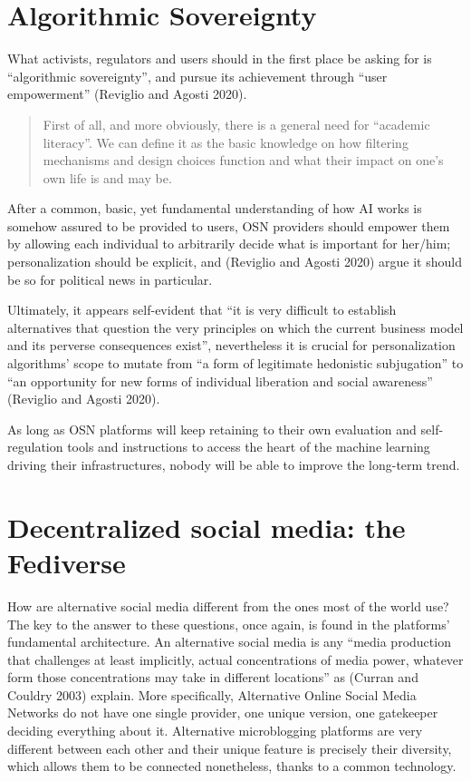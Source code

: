 \documentclass[
  a4paper,
]{book}
\begin{document}
\hypertarget{algorithmic-sovereignty}{%
\section{Algorithmic Sovereignty}\label{algorithmic-sovereignty}}

What activists, regulators and users should in the first place be asking for is ``algorithmic sovereignty'', and pursue its achievement through ``user empowerment'' {(Reviglio and Agosti 2020)}.

\begin{quote}
First of all, and more obviously, there is a general need for ``academic literacy''. We can define it as the basic knowledge on how filtering mechanisms and design choices function and what their impact on one's own life is and may be.
\end{quote}

After a common, basic, yet fundamental understanding of how AI works is somehow assured to be provided to users, OSN providers should empower them by allowing each individual to arbitrarily decide what is important for her/him; personalization should be explicit, and {(Reviglio and Agosti 2020)} argue it should be so for political news in particular.

Ultimately, it appears self-evident that ``it is very difficult to establish alternatives that question the very principles on which the current business model and its perverse consequences exist'', nevertheless it is crucial for personalization algorithms' scope to mutate from ``a form of legitimate hedonistic subjugation'' to ``an opportunity for new forms of individual liberation and social awareness'' {(Reviglio and Agosti 2020)}.

As long as OSN platforms will keep retaining to their own evaluation and self-regulation tools and instructions to access the heart of the machine learning driving their infrastructures, nobody will be able to improve the long-term trend.

\hypertarget{decentralized-social-media-the-fediverse}{%
\section{Decentralized social media: the Fediverse}\label{decentralized-social-media-the-fediverse}}

How are alternative social media different from the ones most of the world use?\\
The key to the answer to these questions, once again, is found in the platforms' fundamental architecture. An alternative social media is any ``media production that challenges at least implicitly, actual concentrations of media power, whatever form those concentrations may take in different locations'' as {(Curran and Couldry 2003)} explain. More specifically, Alternative Online Social Media Networks do not have one single provider, one unique version, one gatekeeper deciding everything about it. Alternative microblogging platforms are very different between each other and their unique feature is precisely their diversity, which allows them to be connected nonetheless, thanks to a common technology.
\end{document}
